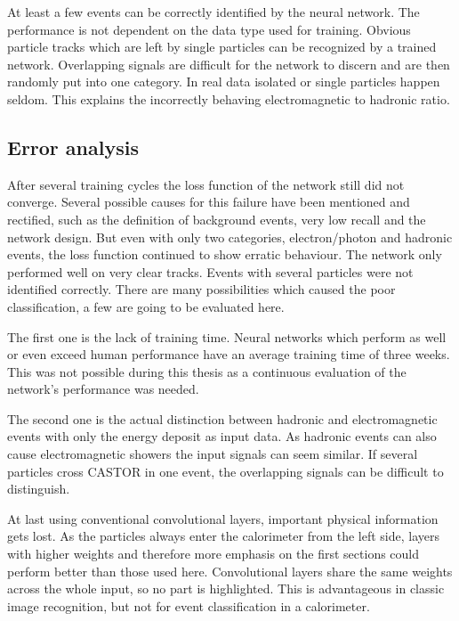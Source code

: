 At least a few events can be correctly identified by the neural network. The performance is not dependent on the data type used for training. Obvious particle tracks which are left by single particles can be recognized by a trained network. Overlapping signals are difficult for the network to discern and are then randomly put into one category. In real data isolated or single particles happen seldom. This explains the incorrectly behaving electromagnetic to hadronic ratio.

\subsection{Error analysis}
After several training cycles the loss function of the network still did not converge. Several possible causes for this failure have been mentioned and rectified, such as the definition of background events, very low recall and the network design. But even with only two categories, electron/photon and hadronic events, the loss function continued to show erratic behaviour. The network only performed well on very clear tracks. Events with several particles were not identified correctly. There are many possibilities which caused the poor classification, a few are going to be evaluated here.

The first one is the lack of training time. Neural networks which perform as well or even exceed human performance have an average training time of three weeks. This was not possible during this thesis as a continuous evaluation of the network's performance was needed. 

The second one is the actual distinction between hadronic and electromagnetic events with only the energy deposit as input data. As hadronic events can also cause electromagnetic showers the input signals can seem similar. If several particles cross CASTOR in one event, the overlapping signals can be difficult to distinguish. 

At last using conventional convolutional layers, important physical information gets lost. As the particles always enter the calorimeter from the left side, layers with higher weights and therefore more emphasis on the first sections could perform better than those used here. Convolutional layers share the same weights across the whole input, so no part is highlighted. This is advantageous in classic image recognition, but not for event classification in a calorimeter. 